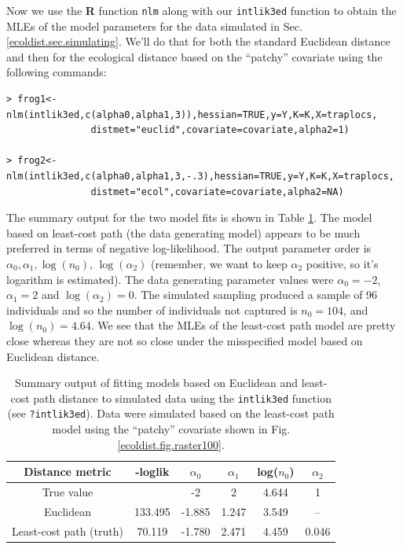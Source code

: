 Now we use the {\bf R} function \mbox{\tt nlm} along with
our \mbox{\tt intlik3ed} function to  obtain the MLEs of the
model parameters for the data simulated
in Sec. \ref{ecoldist.sec.simulating}.
 We'll do that for both the standard Euclidean distance
and then for the ecological distance based on the ``patchy''
covariate using the following commands:
{\small
 \begin{verbatim}
> frog1<-nlm(intlik3ed,c(alpha0,alpha1,3)),hessian=TRUE,y=Y,K=K,X=traplocs,
               distmet="euclid",covariate=covariate,alpha2=1)

> frog2<-nlm(intlik3ed,c(alpha0,alpha1,3,-.3),hessian=TRUE,y=Y,K=K,X=traplocs,
               distmet="ecol",covariate=covariate,alpha2=NA)
\end{verbatim}
}
The summary output for the two model fits is shown in Table \ref{ecoldist.tab.results1}.
The model based on least-cost path (the data generating model) appears
to be much preferred in terms of negative log-likelihood.
The output parameter order is $\alpha_{0}, \alpha_{1}, \log(n_{0})$, 
$\log(\alpha_{2})$ (remember, we want to keep $\alpha_{2}$
positive, so it's logarithm is estimated).
The data generating parameter values were
$\alpha_{0} = - 2$,
$\alpha_{1} = 2$ and $\log(\alpha_{2}) = 0$.
The simulated sampling produced a sample of 96 individuals and so the
number of individuals not captured is
$n_{0} = 104$, and $\log(n_{0}) = 4.64$. We see that the
 MLEs of the least-cost path model are pretty close whereas they are
 not so close under the misspecified model based on Euclidean distance.



\begin{table}
\caption{
Summary output of fitting models based on Euclidean and least-cost
path distance to simulated data using the
 \mbox{\tt intlik3ed} function (see \mbox{\tt ?intlik3ed}). Data were
 simulated based on the least-cost path model using the ``patchy''
 covariate shown in Fig. \ref{ecoldist.fig.raster100}.
}
\begin{tabular}{cccccc} \hline \hline
Distance metric &  -loglik &     $\alpha_0$  & $\alpha_1$  &\mbox{log}($n_{0}$) &  $\alpha_2$ \\ \hline
True value      &          &         -2      &    2       &   4.644 & 1 \\
Euclidean   &133.495&  -1.885 &    1.247 &    3.549 &      -- \\
Least-cost path (truth) & 70.119& -1.780 &  2.471    &    4.459 &
0.046  \\ \hline
\end{tabular}
\label{ecoldist.tab.results1}
\end{table}






